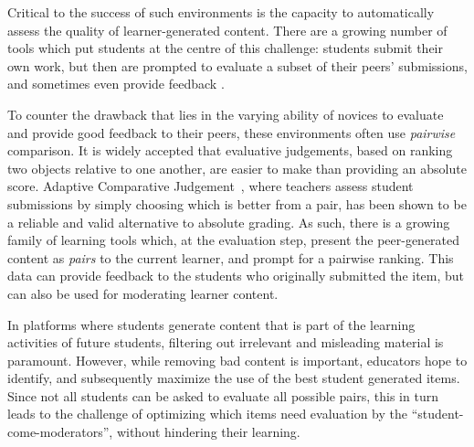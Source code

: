 \documentclass[runningheads]{llncs}
\begin{document}
Critical to the success of such environments is the capacity to 
automatically assess the quality of learner-generated content.
There are a growing number of tools which put students at the centre of this 
challenge: students submit their own work, but then are prompted to 
evaluate a subset of their peers' submissions, and sometimes even provide 
feedback \cite{potter_compair:_2017}\cite{cambre_juxtapeer:_2018}.

To counter the drawback that lies in the varying ability of novices to evaluate 
and provide good feedback to their peers, these environments often use 
\textit{pairwise} comparison. 
It is widely accepted that evaluative judgements, based on ranking two objects 
relative to one another, are easier to make than providing an absolute score. 
Adaptive Comparative Judgement~\cite{pollitt_method_2012}, where teachers 
assess student submissions by simply choosing which is better from a pair, has 
been shown to be a reliable and valid alternative to absolute grading.
As such, there is a growing family of learning tools which, at the evaluation 
step, present the peer-generated content as \textit{pairs} to the current 
learner, and prompt for a pairwise ranking. 
This data can provide feedback to the students who originally submitted the 
item, but can also be used for moderating learner content.

In platforms where students generate content that is part of the learning 
activities of future students, filtering out irrelevant and misleading material 
is paramount. 
However, while removing bad content is important, educators hope to identify, 
and subsequently maximize the use of the best student generated items.
Since not all students can be asked to evaluate all possible pairs, this in 
turn leads to the challenge of optimizing which items need evaluation by the 
``student-come-moderators'', without hindering their learning.
 
\end{document}
